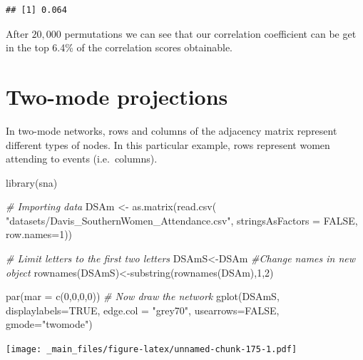 \documentclass[
  notitlepage,
  onecolumn,
  openany]{book}
\newenvironment{Shaded}{\begin{snugshade}}{\end{snugshade}}
\newcommand{\AttributeTok}[1]{\textcolor[rgb]{0.77,0.63,0.00}{#1}}
\newcommand{\CommentTok}[1]{\textcolor[rgb]{0.56,0.35,0.01}{\textit{#1}}}
\newcommand{\ConstantTok}[1]{\textcolor[rgb]{0.00,0.00,0.00}{#1}}
\newcommand{\DecValTok}[1]{\textcolor[rgb]{0.00,0.00,0.81}{#1}}
\newcommand{\FunctionTok}[1]{\textcolor[rgb]{0.00,0.00,0.00}{#1}}
\newcommand{\NormalTok}[1]{#1}
\newcommand{\OtherTok}[1]{\textcolor[rgb]{0.56,0.35,0.01}{#1}}
\newcommand{\StringTok}[1]{\textcolor[rgb]{0.31,0.60,0.02}{#1}}
\begin{document}
\begin{verbatim}
## [1] 0.064
\end{verbatim}

After \(20,000\) permutations we can see that our correlation coefficient can be get in the top 6.4\% of the correlation scores obtainable.

\hypertarget{two-mode-projections}{%
\chapter{Two-mode projections}\label{two-mode-projections}}

In two-mode networks, rows and columns of the adjacency matrix represent different types of nodes. In this particular example, rows represent women attending to events (i.e.~columns).

\begin{Shaded}
\begin{Highlighting}[]
\FunctionTok{library}\NormalTok{(sna)}

\CommentTok{\# Importing data}
\NormalTok{DSAm }\OtherTok{\textless{}{-}} \FunctionTok{as.matrix}\NormalTok{(}\FunctionTok{read.csv}\NormalTok{(}
    \StringTok{"datasets/Davis\_SouthernWomen\_Attendance.csv"}\NormalTok{,}
    \AttributeTok{stringsAsFactors =} \ConstantTok{FALSE}\NormalTok{, }\AttributeTok{row.names=}\DecValTok{1}\NormalTok{))}


\CommentTok{\# Limit letters to the first two letters}
\NormalTok{DSAmS}\OtherTok{\textless{}{-}}\NormalTok{DSAm}
\CommentTok{\#Change names in new object}
\FunctionTok{rownames}\NormalTok{(DSAmS)}\OtherTok{\textless{}{-}}\FunctionTok{substring}\NormalTok{(}\FunctionTok{rownames}\NormalTok{(DSAm),}\DecValTok{1}\NormalTok{,}\DecValTok{2}\NormalTok{)}

\FunctionTok{par}\NormalTok{(}\AttributeTok{mar =} \FunctionTok{c}\NormalTok{(}\DecValTok{0}\NormalTok{,}\DecValTok{0}\NormalTok{,}\DecValTok{0}\NormalTok{,}\DecValTok{0}\NormalTok{))}
\CommentTok{\# Now draw the network}
\FunctionTok{gplot}\NormalTok{(DSAmS, }\AttributeTok{displaylabels=}\ConstantTok{TRUE}\NormalTok{,}
      \AttributeTok{edge.col =} \StringTok{"grey70"}\NormalTok{,}
      \AttributeTok{usearrows=}\ConstantTok{FALSE}\NormalTok{, }\AttributeTok{gmode=}\StringTok{"twomode"}\NormalTok{)}
\end{Highlighting}
\end{Shaded}

\texttt{[image: \_main\_files/figure-latex/unnamed-chunk-175-1.pdf]}
\end{document}
